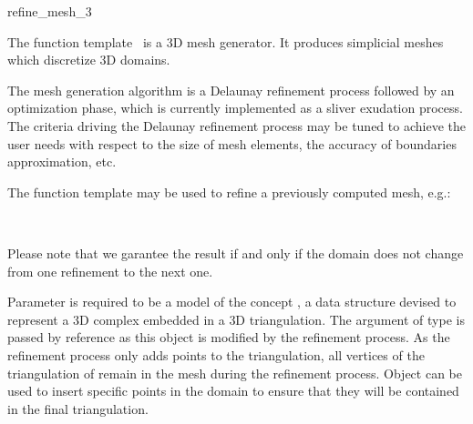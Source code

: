 \ccRefPageBegin


\begin{ccRefFunction}{refine_mesh_3}  %


\ccDefinition

The function template \ccRefName\ is a 3D
 mesh generator. It produces simplicial meshes which discretize
 3D domains.

The mesh generation algorithm is a Delaunay refinement process
followed by an optimization phase, which is currently implemented
as a sliver exudation process. 
The  criteria driving the Delaunay refinement
process may be tuned to achieve the user needs with respect to
the size of mesh elements, the accuracy of boundaries approximation,
etc.



\begin{ccAdvanced}
The function template \ccRefName{} may be used to refine a previously
computed mesh, e.g.:

\\

Please note that we garantee the result if and only if the domain does
not change from one refinement to the next one.
\end{ccAdvanced}


\ccParameters

Parameter  is required to be a model of
the concept 
, a data structure devised to
represent a 3D complex embedded in a 3D triangulation.
The argument  of type  is passed by
reference as this object is modified by the refinement process. As the
refinement process only adds points to the triangulation, all 
vertices of the triangulation of  remain in the
mesh during the refinement process. Object  can be used to insert
specific points in the domain to ensure that they will be contained in the
final triangulation.


\end{ccRefFunction}
